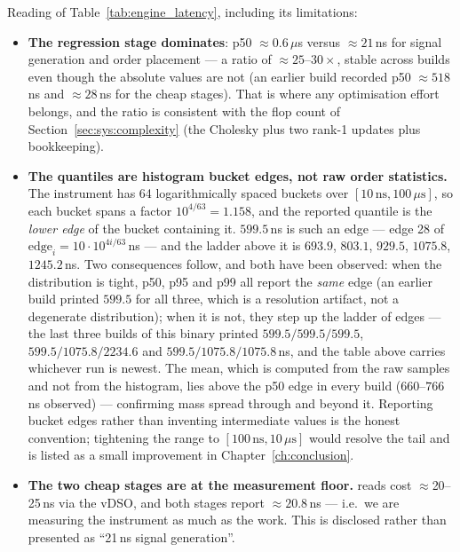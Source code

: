 Reading of Table~\ref{tab:engine_latency}, including its limitations:
\begin{itemize}
  \item \textbf{The regression stage dominates}: p50 $\approx0.6\,\mu$s versus
    $\approx21$\,ns for signal generation and order placement --- a ratio of
    $\approx25$--$30\times$, stable across builds even though the absolute values are not
    (an earlier build recorded p50 $\approx518$\,ns and $\approx28$\,ns for the cheap
    stages). That is where any optimisation effort belongs, and the ratio is consistent
    with the flop count of Section~\ref{sec:sys:complexity} (the Cholesky plus two rank-1
    updates plus bookkeeping).
  \item \textbf{The quantiles are histogram bucket edges, not raw order statistics.} The
    instrument has 64 logarithmically spaced buckets over
    $[10\,\text{ns},100\,\mu\text{s}]$, so each bucket spans a factor
    $10^{4/63}=1.158$, and the reported quantile is the \emph{lower edge} of the bucket
    containing it. $599.5$\,ns is such an edge --- edge 28 of
    $\text{edge}_i=10\cdot10^{4i/63}$\,ns --- and the ladder above it is $693.9$, $803.1$,
    $929.5$, $1075.8$, $1245.2$\,ns. Two consequences follow, and both have been observed: when the
    distribution is tight, p50, p95 and p99 all report the \emph{same} edge (an earlier
    build printed $599.5$ for all three, which is a resolution artifact, not a degenerate
    distribution); when it is not, they step up the ladder of edges --- the last three
    builds of this binary printed $599.5/599.5/599.5$, $599.5/1075.8/2234.6$ and
    $599.5/1075.8/1075.8$\,ns, and the table above carries whichever run is newest. The
    mean, which is computed from the raw samples and not from the histogram, lies above the
    p50 edge in every build ($660$--$766$\,ns observed) --- confirming mass spread through and beyond it. Reporting
    bucket edges rather than inventing intermediate values is the honest convention;
    tightening the range to $[100\,\text{ns},10\,\mu\text{s}]$ would resolve the tail and is
    listed as a small improvement in Chapter~\ref{ch:conclusion}.
  \item \textbf{The two cheap stages are at the measurement floor.}  reads cost
    $\approx$20--25\,ns via the vDSO, and both stages report $\approx20.8$\,ns --- i.e.\ we
    are measuring the instrument as much as the work. This is disclosed rather than
    presented as ``21\,ns signal generation''.
\end{itemize}

